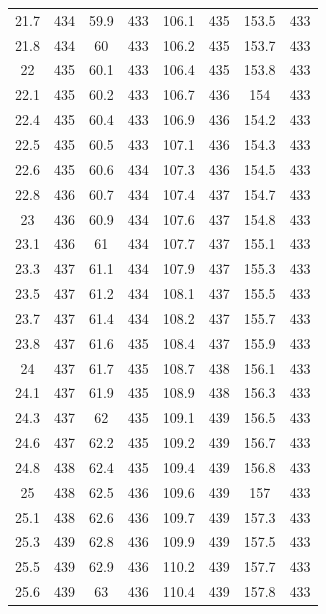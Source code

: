 \documentclass[12pt]{ctexart}
\numberwithin{equation}{section}
\begin{document}
\begin{longtable}{cc|cc|cc|cc}
21.7  &  434  &  59.9  &  433  &  106.1  &  435  &  153.5  &  433  \\
21.8  &  434  &  60  &  433  &  106.2  &  435  &  153.7  &  433  \\
22  &  435  &  60.1  &  433  &  106.4  &  435  &  153.8  &  433  \\
22.1  &  435  &  60.2  &  433  &  106.7  &  436  &  154  &  433  \\
22.4  &  435  &  60.4  &  433  &  106.9  &  436  &  154.2  &  433  \\
22.5  &  435  &  60.5  &  433  &  107.1  &  436  &  154.3  &  433  \\
22.6  &  435  &  60.6  &  434  &  107.3  &  436  &  154.5  &  433  \\
22.8  &  436  &  60.7  &  434  &  107.4  &  437  &  154.7  &  433  \\
23  &  436  &  60.9  &  434  &  107.6  &  437  &  154.8  &  433  \\
23.1  &  436  &  61  &  434  &  107.7  &  437  &  155.1  &  433  \\
23.3  &  437  &  61.1  &  434  &  107.9  &  437  &  155.3  &  433  \\
23.5  &  437  &  61.2  &  434  &  108.1  &  437  &  155.5  &  433  \\
23.7  &  437  &  61.4  &  434  &  108.2  &  437  &  155.7  &  433  \\
23.8  &  437  &  61.6  &  435  &  108.4  &  437  &  155.9  &  433  \\
24  &  437  &  61.7  &  435  &  108.7  &  438  &  156.1  &  433  \\
24.1  &  437  &  61.9  &  435  &  108.9  &  438  &  156.3  &  433  \\
24.3  &  437  &  62  &  435  &  109.1  &  439  &  156.5  &  433  \\
24.6  &  437  &  62.2  &  435  &  109.2  &  439  &  156.7  &  433  \\
24.8  &  438  &  62.4  &  435  &  109.4  &  439  &  156.8  &  433  \\
25  &  438  &  62.5  &  436  &  109.6  &  439  &  157  &  433  \\
25.1  &  438  &  62.6  &  436  &  109.7  &  439  &  157.3  &  433  \\
25.3  &  439  &  62.8  &  436  &  109.9  &  439  &  157.5  &  433  \\
25.5  &  439  &  62.9  &  436  &  110.2  &  439  &  157.7  &  433  \\
25.6  &  439  &  63  &  436  &  110.4  &  439  &  157.8  &  433  \\

\end{longtable}
\end{document}
